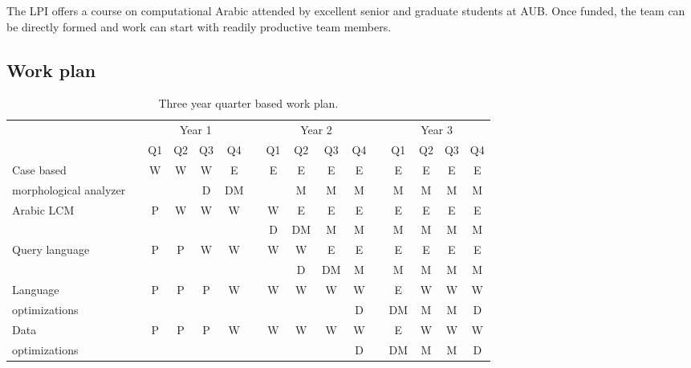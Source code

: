 \documentclass[12pt]{article}
\begin{document}
The LPI offers a course on computational Arabic attended
by excellent senior and graduate students at AUB. 
Once funded, the team can be directly formed and work can start
with readily productive team members. 

\subsection{Work plan}
\label{s:design:plan}


\begin{table}[bt]
\centering
\caption{Three year quarter based work plan.}
\small
\begin{tabular}{lp{.1cm}ccccp{.1cm}ccccp{.1cm}cccc} \\
& & \multicolumn{4}{c}{Year 1} & & \multicolumn{4}{c}{Year 2} & & \multicolumn{4}{c}{Year 3} \\ \cline{3-6} \cline{8-11} \cline{13-16} %
& & Q1 & Q2 & Q3 & Q4 & & Q1 & Q2 & Q3 & Q4 & & Q1 & Q2 & Q3 & Q4 \\ \bottomrule

Case based & & 
W & W & W & E & & E & E & E & E & & E & E & E & E \\ 
morphological analyzer & & 
 &  & D & DM & &   & M & M & M & & M & M & M & M \\  \hline

\multirow{2}{*}{Arabic LCM} & & 
P & W & W & W & & W & E & E & E & & E & E & E & E \\ 
& & 
 &  &  &  & & D & DM & M & M & & M & M & M & M \\ \hline

\multirow{2}{*}{Query language} & & 
P & P & W & W & & W & W & E & E & & E & E & E & E \\ 
& & 
  &  &  &  & &  & D & DM & M & & M & M & M & M \\ \hline

Language & & 
P & P & P & W & & W & W & W & W & & E & W & W & W \\ 
optimizations & & 
 &  &  &  & &  &  &  & D & & DM & M & M & D \\ \hline

Data  & & 
P & P & P & W & & W & W & W & W & & E & W & W & W \\ 
optimizations & & 
 &  &  &  & &  &  &  & D & & DM & M & M & D \\ \hline


\end{tabular}
\end{table}
\end{document}
